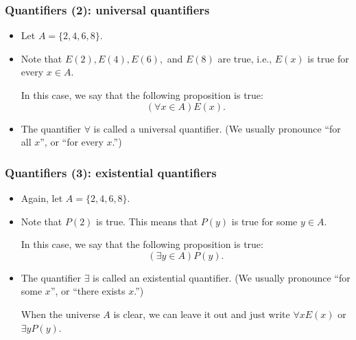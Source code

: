 \begin{frame}\frametitle{Quantifiers (2): universal quantifiers}
  \begin{itemize}
  \item Let $A=\{2,4,6,8\}$.
  \item Note that $E(2), E(4), E(6),$ and $E(8)$ are true, i.e.,
    $E(x)$ is true for every $x\in A$.  \pause
    
    In this case, we say that the following proposition is true:
    \[(\forall x\in A) E(x). \]
    \pause

  \item The quantifier $\forall$ is called a universal quantifier.
    (We usually pronounce ``for all $x$'', or ``for every $x$.'')

  \end{itemize}
\end{frame}

\begin{frame}\frametitle{Quantifiers (3): existential quantifiers}
  \begin{itemize}
  \item Again, let $A=\{2,4,6,8\}$.
  \item Note that $P(2)$ is true.  This means that $P(y)$ is true for
    some $y\in A$.  \pause

    In this case, we say that the following proposition is true:
    \[(\exists y\in A) P(y). \]
    \pause
    
  \item The quantifier $\exists$ is called an existential quantifier.
    (We usually pronounce ``for some $x$'', or ``there exists $x$.'')
    \pause

    \begin{tcolorbox}
      When the universe $A$ is clear, we can leave it out and just
      write $\forall x E(x)$ or $\exists y P(y)$.
    \end{tcolorbox}

  \end{itemize}
\end{frame}

